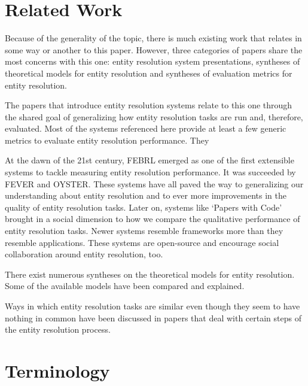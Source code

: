 \documentclass[11pt]{article}
\begin{document}
    \section{Related Work}\label{sec:related}
    
    Because of the generality of the topic, there is much existing work that
    relates in some way or another to this paper.
    However, three categories of papers share the most concerns with this one:
    entity resolution system presentations, syntheses of theoretical models for
    entity resolution and syntheses of evaluation metrics for entity resolution.

    The papers that introduce entity resolution systems relate to this one
    through the shared goal of generalizing how entity resolution tasks are run
    and, therefore, evaluated.
    Most of the systems referenced here provide at least a few generic metrics
    to evaluate entity resolution performance.
    They 

    At the dawn of the 21st century, FEBRL\cite{febrl2002} emerged as one of the
    first extensible systems to tackle measuring entity resolution performance.
    It was succeeded by FEVER\cite{fever2009} and OYSTER\cite{oyster2012}. 
    These systems have all paved the way to generalizing our understanding about
    entity resolution and to ever more improvements in the quality of entity
    resolution tasks.
    Later on, systems like `Papers with Code'\cite{papwithcode2019} brought in
    a social dimension to how we compare the qualitative performance of entity
    resolution tasks.
    Newer systems resemble frameworks more than they resemble
    applications\cite{magellan2020,jedai2017}.
    These systems are open-source and encourage social collaboration around
    entity resolution, too.

    
    There exist numerous syntheses on the theoretical models for entity
    resolution\cite{fs1969,Ben2009Swoosh,Tal11}.
    Some of the available models have been compared and
    explained\cite{Tal11,tal2013}.

    Ways in which entity resolution tasks are similar even though they seem
    to have nothing in common have been discussed in papers that deal with
    certain steps of the entity resolution process\cite{Pap19,Chen09}.

    \section{Terminology}\label{sec:terminology}
\end{document}
